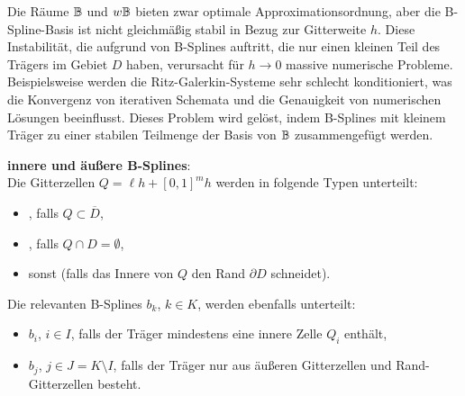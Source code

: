Die Räume $\mathbb{B}$ und $w\mathbb{B}$ bieten zwar optimale Approximationsordnung,
aber die B-Spline-Basis ist nicht gleichmäßig stabil in Bezug zur Gitterweite $h$.
Diese Instabilität, die aufgrund von B-Splines auftritt, die nur einen kleinen Teil des Trägers
im Gebiet $D$ haben, verursacht für $h \to 0$ massive numerische Probleme.
Beispielsweise werden die Ritz-Galerkin-Systeme sehr schlecht konditioniert,
was die Konvergenz von iterativen Schemata und die Genauigkeit von numerischen Lösungen
beeinflusst.
Dieses Problem wird gelöst, indem B-Splines mit kleinem Träger zu einer stabilen Teilmenge der
Basis von $\mathbb{B}$ zusammengefügt werden.

\textbf{innere und äußere B-Splines}:\\
Die Gitterzellen $Q = \ell h + [0, 1]^m h$ werden in folgende Typen unterteilt:
\begin{itemize}
    \item
    , falls $Q \subset \overline{D}$,

    \item
    , falls $Q \cap D = \emptyset$,

    \item
     sonst
    (falls das Innere von $Q$ den Rand $\partial D$ schneidet).
\end{itemize}
Die relevanten B-Splines $b_k$, $k \in K$, werden ebenfalls unterteilt:
\begin{itemize}
    \item
     $b_i$, $i \in I$,
    falls der Träger mindestens eine innere Zelle $Q_i$ enthält,

    \item
     $b_j$, $j \in J = K \setminus I$,
    falls der Träger nur aus äußeren Gitterzellen und Rand-Gitterzellen besteht.
\end{itemize}

\linie

